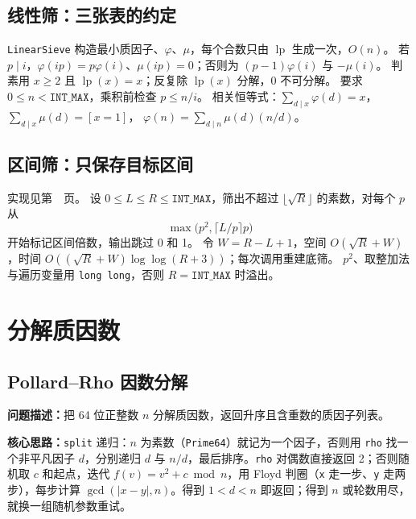 

\subsection{线性筛：三张表的约定}\label{knowledge-linear-sieve}
\texttt{LinearSieve} 构造最小质因子、$\varphi$、$\mu$，每个合数只由 $\operatorname{lp}$ 生成一次，$O(n)$。
若 $p\mid i$，$\varphi(ip)=p\varphi(i)$、$\mu(ip)=0$；否则为 $(p-1)\varphi(i)$ 与 $-\mu(i)$。
判素用 $x\ge2$ 且 $\operatorname{lp}(x)=x$；反复除 $\operatorname{lp}(x)$ 分解，0 不可分解。
要求 $0\le n<\texttt{INT\_MAX}$，乘积前检查 $p\le n/i$。
相关恒等式：$\sum_{d\mid x}\varphi(d)=x$，$\sum_{d\mid x}\mu(d)=[x=1]$，
$\varphi(n)=\sum_{d\mid n}\mu(d)(n/d)$。




\subsection{区间筛：只保存目标区间}\label{knowledge-segmented-sieve}
实现见第~\pageref{compact-segmented_primes}~页。
设 $0\le L\le R\le\texttt{INT\_MAX}$，筛出不超过 $\lfloor\sqrt R\rfloor$ 的素数，对每个 $p$ 从
\[
\max\bigl(p^2,\lceil L/p\rceil p\bigr)
\]
开始标记区间倍数，输出跳过 0 和 1。
令 $W=R-L+1$，空间 $O(\sqrt R+W)$，时间 $O((\sqrt R+W)\log\log(R+3))$；每次调用重建底筛。
$p^2$、取整加法与遍历变量用 \texttt{long long}，否则 $R=\texttt{INT\_MAX}$ 时溢出。


\Needspace{180pt}

\section{分解质因数}

\subsection{Pollard--Rho 因数分解}\label{compact-PollardRho}

\noindent\textbf{问题描述：}\allowbreak 把 64 位正整数 $n$ 分解质因数，返回升序且含重数的质因子列表。

\textbf{核心思路：}\allowbreak \texttt{split} 递归：$n$ 为素数（\texttt{Prime64}）就记为一个因子，否则用 \texttt{rho} 找一个非平凡因子 $d$，分别递归 $d$ 与 $n/d$，最后排序。\texttt{rho} 对偶数直接返回 2；否则随机取 $c$ 和起点，迭代 $f(v)=v^2+c\bmod n$，用 Floyd 判圈（\texttt{x} 走一步、\texttt{y} 走两步），每步计算 $\gcd(|x-y|,n)$。得到 $1<d<n$ 即返回；得到 $n$ 或轮数用尽，就换一组随机参数重试。

